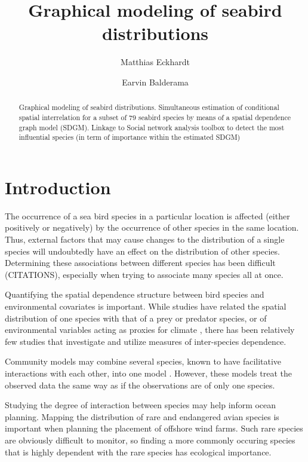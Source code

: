 \documentclass{statsoc}
\title[Graphical modeling of seabird distributions]{Graphical modeling of seabird distributions}
\author[Author 1 {\it et al.}]{Matthias Eckhardt}
\author{Earvin Balderama}
\begin{document}



\begin{abstract}
  Graphical modeling of seabird distributions. Simultaneous estimation of conditional spatial interrelation for a subset of $79$ seabird species by means of a spatial dependence graph model (SDGM). Linkage to Social network analysis toolbox to detect the most influential species (in term of importance within the estimated SDGM)  
\end{abstract}




\section{Introduction}

The occurrence of a sea bird species in a particular location is affected (either positively or negatively) by the occurrence of other species in the same location. 
Thus, external factors that may cause changes to the distribution of a single species will undoubtedly have an effect on the distribution of other species. Determining these associations between different species has been difficult (CITATIONS), especially when trying to associate many species all at once.

Quantifying the spatial dependence structure between bird species and environmental covariates is important. While studies have related the spatial distribution of one species with that of a prey or predator species, or of environmental variables acting as proxies for climate \citep{Goyert2014, Goyert2016}, there has been relatively few studies that investigate and utilize measures of inter-species dependence.

Community models may combine several species, known to have facilitative interactions with each other, into one model \citep{Goyert2016, Sollmann2016}. However, these models treat the observed data the same way as if the observations are of only one species.

Studying the degree of interaction between species may help inform ocean planning. Mapping the distribution of rare and endangered avian species is important when planning the placement of offshore wind farms. Such rare species are obviously difficult to monitor, so finding a more commonly occuring species that is highly dependent with the rare species has ecological importance.
\end{document}
